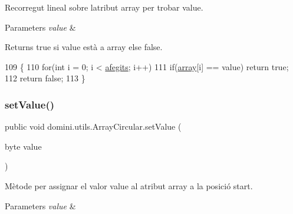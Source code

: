 Recorregut lineal sobre l\textquotesingle{}atribut array per trobar value. 


\begin{DoxyParams}{Parameters}
{\em value} & \\
\hline
\end{DoxyParams}
\begin{DoxyReturn}{Returns}
true si value està a array else false. 
\end{DoxyReturn}

\begin{DoxyCode}
109     \{
110         \textcolor{keywordflow}{for}(\textcolor{keywordtype}{int} i = 0; i < \hyperlink{classdomini_1_1utils_1_1ArrayCircular_a08291d877b2d4c71c219df6f983b279a}{afegits}; i++)
111             \textcolor{keywordflow}{if}(\hyperlink{classdomini_1_1utils_1_1ArrayCircular_a2af77a58adf605b58d79a1879a0a593f}{array}[i] == value) \textcolor{keywordflow}{return} \textcolor{keyword}{true};
112         \textcolor{keywordflow}{return} \textcolor{keyword}{false};
113     \}
\end{DoxyCode}
\mbox{\label{classdomini_1_1utils_1_1ArrayCircular_a29e48f57c422739fff65e1f5d14c72c2}} 
\subsubsection{\texorpdfstring{set\+Value()}{setValue()}}
{\footnotesize\ttfamily public void domini.\+utils.\+Array\+Circular.\+set\+Value (\begin{DoxyParamCaption}\item[{byte}]{value }\end{DoxyParamCaption})\hspace{0.3cm}{\ttfamily [inline]}}



Mètode per assignar el valor value al atribut array a la posició start. 


\begin{DoxyParams}{Parameters}
{\em value} & \\
\hline
\end{DoxyParams}


